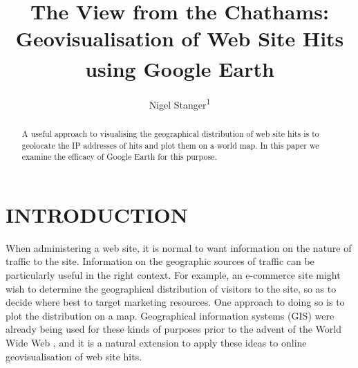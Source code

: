 \documentclass[10pt]{article}
\begin{document}
\title{The View from the Chathams: \\ Geovisualisation of Web Site Hits using Google Earth\textsuperscript{\texttrademark}}

\author{Nigel Stanger\textsuperscript{1}}


\PresentedAt

\begin{abstract}
A useful approach to visualising the geographical distribution of web site hits is to geolocate the IP addresses of hits and plot them on a world map. In this paper we examine the efficacy of Google Earth for this purpose.
\end{abstract}



\section{INTRODUCTION}

When administering a web site, it is normal to want information on the nature of traffic to the site. Information on the geographic sources of traffic can be particularly useful in the right context. For example, an e-commerce site might wish to determine the geographical distribution of visitors to the site, so as to decide where best to target marketing resources. One approach to doing so is to plot the distribution on a map. Geographical information systems (GIS) were already being used for these kinds of purposes prior to the advent of the World Wide Web \cite{Beau-JR-1991-GIS}, and it is a natural extension to apply these ideas to online geovisualisation of web site hits.
\end{document}
